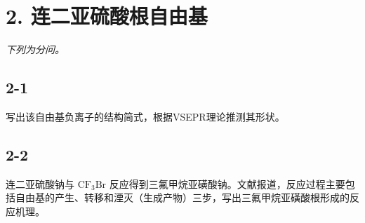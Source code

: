 \section*{2. 连二亚硫酸根自由基}
\textit{下列为分问。}

\subsection*{2-1}
写出该⾃由基负离⼦的结构简式，根据VSEPR理论推测其形状。

\subsection*{2-2}
连⼆亚硫酸钠与 $\mathrm { C F _ { 3 } B r }$ 反应得到三氟甲烷亚磺酸钠。⽂献报道，反应过程主要包括⾃由基的产⽣、转移和湮灭（⽣成产物）三步，写出三氟甲烷亚磺酸根形成的反应机理。
